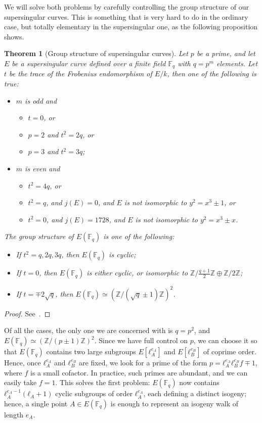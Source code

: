 \documentclass[10pt]{article}
\theoremstyle{plain}
\newtheorem{theorem}{Theorem}
\theoremstyle{definition}
\def\F{\ensuremath{\mathbb{F}}}
\begin{document}
We will solve both problems by carefully controlling the group
structure of our supersingular curves. %
This is something that is very hard to do in the ordinary case, but
totally elementary in the supersingular one, as the following
proposition shows.

\begin{theorem}[Group structure of supersingular curves]
  Let $p$ be a prime, and let $E$ be a supersingular curve defined
  over a finite field $\F_q$ with $q=p^m$ elements. %
  Let $t$ be the trace of the Frobenius endomorphism of $E/k$, then
  one of the following is true:
  \begin{itemize}
  \item $m$ is odd and
    \begin{itemize}
    \item $t=0$, or
    \item $p=2$ and $t^2=2q$, or
    \item $p=3$ and $t^2=3q$;
    \end{itemize}
  \item $m$ is even and
    \begin{itemize}
    \item $t^2=4q$, or
    \item $t^2=q$, and $j(E)=0$, and $E$ is not isomorphic to
      $y^2=x^3±1$, or
    \item $t^2=0$, and $j(E)=1728$, and $E$ is not isomorphic to
      $y^2=x^3±x$.
    \end{itemize}
  \end{itemize}
  
  The group structure of $E(\F_q)$ is one of the following:
  \begin{itemize}
  \item If $t^2=q,2q,3q$, then $E(\F_q)$ is cyclic;
  \item If $t=0$, then $E(\F_q)$ is either cyclic, or isomorphic to
    $ℤ/\frac{q+1}{2}ℤ⊕ℤ/2ℤ$;
  \item If $t=∓2\sqrt{q}$, then $E(\F_q)≃(ℤ/(\sqrt{q}±1)ℤ)^2$.
  \end{itemize}
\end{theorem}
\begin{proof}
  See~\cite{waterhouse69,MOV}.
\end{proof}

Of all the cases, the only one we are concerned with is $q=p^2$, and
$E(\F_q)≃(ℤ/(p±1)ℤ)^2$. %
Since we have full control on $p$, we can choose it so that $E(\F_q)$
contains two large subgroups $E[ℓ_A^{e_A}]$ and $E[ℓ_B^{e_B}]$ of
coprime order. %
Hence, once $ℓ_A^{e_A}$ and $ℓ_B^{e_B}$ are fixed, we look for a prime
of the form $p=ℓ_A^{e_A}ℓ_B^{e_B}f∓1$, where $f$ is a small
cofactor. %
In practice, such primes are abundant, and we can easily take $f=1$. %
This solves the first problem: $E(\F_q)$ now contains
$ℓ_A^{e_A-1}(ℓ_A+1)$ cyclic subgroups of order $ℓ_A^{e_A}$, each
defining a distinct isogeny; hence, a single point $A∈E(\F_q)$ is
enough to represent an isogeny walk of length $e_A$.
\end{document}
